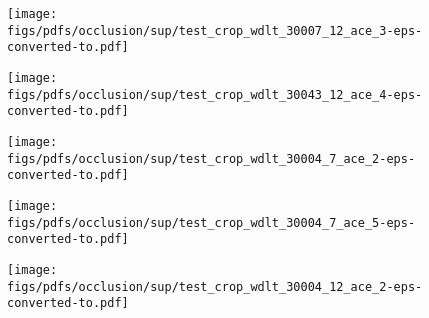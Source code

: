 \documentclass[runningheads]{llncs}
\begin{document}
\begin{figure*}[t!]
    \centering
    \begin{subfigure}[b]{0.16\linewidth}        \centering


        
    \end{subfigure}
    \begin{subfigure}[b]{0.16\linewidth}        \centering
        \texttt{[image: figs/pdfs/occlusion/sup/test\_crop\_wdlt\_30007\_12\_ace\_3-eps-converted-to.pdf]}
    \end{subfigure}
    \begin{subfigure}[b]{0.16\linewidth}        \centering
        \texttt{[image: figs/pdfs/occlusion/sup/test\_crop\_wdlt\_30043\_12\_ace\_4-eps-converted-to.pdf]}
    \end{subfigure}
    \begin{subfigure}[b]{0.16\linewidth}        \centering
        \texttt{[image: figs/pdfs/occlusion/sup/test\_crop\_wdlt\_30004\_7\_ace\_2-eps-converted-to.pdf]}
    \end{subfigure}
    \begin{subfigure}[b]{0.16\linewidth}        \centering
        \texttt{[image: figs/pdfs/occlusion/sup/test\_crop\_wdlt\_30004\_7\_ace\_5-eps-converted-to.pdf]}
    \end{subfigure}
    \begin{subfigure}[b]{0.16\linewidth}        \centering
        \texttt{[image: figs/pdfs/occlusion/sup/test\_crop\_wdlt\_30004\_12\_ace\_2-eps-converted-to.pdf]}
    \end{subfigure} \\ \vspace{1mm}
    
    
    \begin{subfigure}[b]{0.16\linewidth}        \centering


        

\end{subfigure}
\end{figure*}
\end{document}
